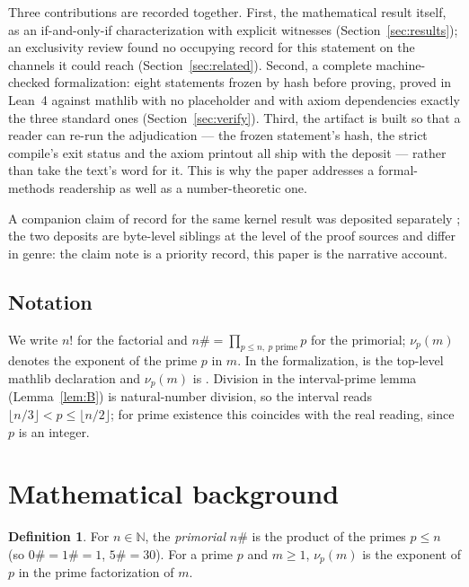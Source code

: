 \documentclass[11pt]{article}
\theoremstyle{definition}
\newtheorem{definition}[theorem]{Definition}
\begin{document}
Three contributions are recorded together. First, the mathematical result
itself, as an if-and-only-if characterization with explicit witnesses
(Section~\ref{sec:results}); an exclusivity review found no
occupying record for this statement on the channels it could reach
(Section~\ref{sec:related}). Second, a complete machine-checked formalization:
eight statements frozen by hash before proving, proved in Lean~4 against
mathlib with no placeholder and with axiom dependencies exactly the three
standard ones (Section~\ref{sec:verify}). Third, the artifact is built so
that a reader can re-run the adjudication --- the frozen statement's hash,
the strict compile's exit status and the axiom printout all ship with the
deposit --- rather than take the text's word for it. This is why the paper
addresses a formal-methods readership as well as a number-theoretic one.

A companion claim of record for the same kernel result was deposited
separately \cite{claimdeposit}; the two deposits
are byte-level siblings at the level of the proof sources and differ in
genre: the claim note is a priority record, this paper is the narrative
account.

\subsection*{Notation}

We write $n!$ for the factorial and $n\# = \prod_{p \le n,\ p \text{ prime}} p$
for the primorial; $\nu_p(m)$ denotes the exponent of the prime $p$ in $m$.
In the formalization,  is the top-level mathlib declaration
and $\nu_p(m)$ is . Division in the interval-prime
lemma (Lemma~\ref{lem:B}) is natural-number division, so the interval reads
$\lfloor n/3 \rfloor < p \le \lfloor n/2 \rfloor$; for prime existence this
coincides with the real reading, since $p$ is an integer.

\section{Mathematical background}\label{sec:background}

\begin{definition}\label{def:primorial}
For $n \in \mathbb{N}$, the \emph{primorial} $n\#$ is the product of the
primes $p \le n$ (so $0\# = 1\# = 1$, $5\# = 30$). For a prime $p$ and
$m \ge 1$, $\nu_p(m)$ is the exponent of $p$ in the prime factorization of
$m$.
\end{definition}
\end{document}
